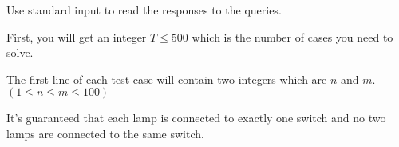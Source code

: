 Use standard input to read the responses to the queries.

First, you will get an integer $T \le 500$ which is the number of cases you need to solve.

The first line of each test case will contain two integers which are $n$ and $m$. $(1 \le n \le m \le 100)$

It's guaranteed that each lamp is connected to exactly one switch and no two lamps are connected to the same switch.